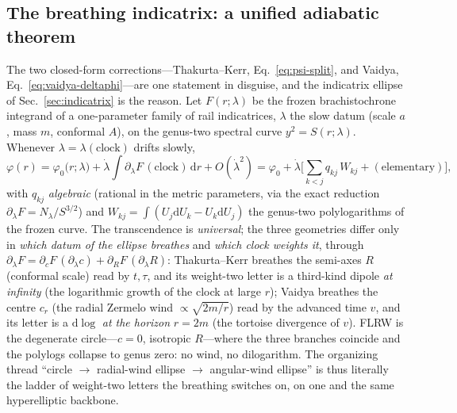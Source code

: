 \documentclass[12pt]{iopart}
\newcommand{\dd}{\mathrm{d}}
\begin{document}
\subsection{The breathing indicatrix: a unified adiabatic theorem}
\label{sec:unified}
The two closed-form corrections---Thakurta--Kerr, Eq.~\eqref{eq:psi-split}, and
Vaidya, Eq.~\eqref{eq:vaidya-deltaphi}---are one statement in disguise, and the
indicatrix ellipse of Sec.~\ref{sec:indicatrix} is the reason. Let $F(r;\lambda)$
be the frozen brachistochrone integrand of a one-parameter family of rail
indicatrices, $\lambda$ the slow datum (scale $a$, mass $m$, conformal $A$), on the
genus-two spectral curve $y^2=S(r;\lambda)$. Whenever $\lambda=\lambda(\text{clock})$
drifts slowly,
\begin{equation}
    \varphi(r)=\varphi_0\!\big(r;\lambda\big)+\dot\lambda\!\int\!\partial_\lambda
    F\,(\text{clock})\,\dd r+O(\dot\lambda^2)
    =\varphi_0+\dot\lambda\Big[\sum_{k<j} q_{kj}\,W_{kj}+(\text{elementary})\Big],
    \label{eq:unified}
\end{equation}
with $q_{kj}$ \emph{algebraic} (rational in the metric parameters, via the exact
reduction $\partial_\lambda F=N_\lambda/S^{3/2}$) and $W_{kj}=\int(U_j\dd U_k-U_k
\dd U_j)$ the genus-two polylogarithms of the frozen curve. The transcendence is
\emph{universal}; the three geometries differ only in \emph{which datum of the
ellipse breathes} and \emph{which clock weights it}, through
$\partial_\lambda F=\partial_c F\,(\partial_\lambda c)+\partial_R F\,
(\partial_\lambda R)$: Thakurta--Kerr breathes the semi-axes $R$ (conformal scale)
read by $t,\tau$, and its weight-two letter is a third-kind dipole \emph{at
infinity} (the logarithmic growth of the clock at large $r$); Vaidya breathes the
centre $c_r$ (the radial Zermelo wind $\propto\sqrt{2m/r}$) read by the advanced
time $v$, and its letter is a $\dd\log$ \emph{at the horizon} $r=2m$ (the tortoise
divergence of $v$). FLRW is the degenerate circle---$c=0$, isotropic $R$---where the
three branches coincide and the polylogs collapse to genus zero: no wind, no
dilogarithm. The organizing thread ``circle $\to$ radial-wind ellipse $\to$
angular-wind ellipse'' is thus literally the ladder of weight-two letters the
breathing switches on, on one and the same hyperelliptic backbone.
\end{document}
